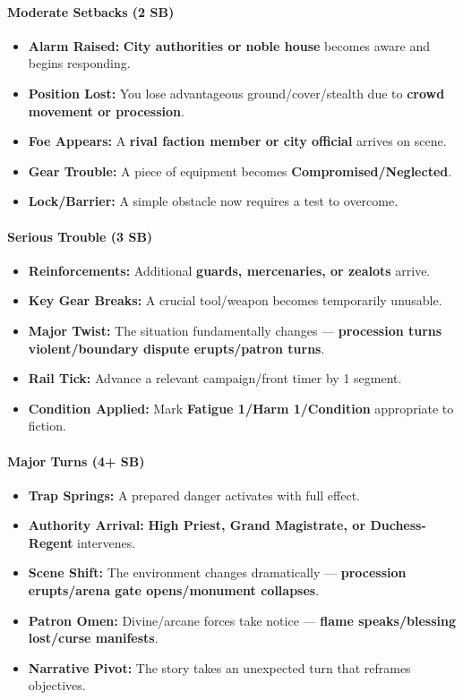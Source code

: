 \paragraph{Moderate Setbacks (2 SB)}
\begin{itemize}
\item \textbf{Alarm Raised:} \textbf{City authorities or noble house} becomes aware and begins responding.
\item \textbf{Position Lost:} You lose advantageous ground/cover/stealth due to \textbf{crowd movement or procession}.
\item \textbf{Foe Appears:} A \textbf{rival faction member or city official} arrives on scene.
\item \textbf{Gear Trouble:} A piece of equipment becomes \textbf{Compromised/Neglected}.
\item \textbf{Lock/Barrier:} A simple obstacle now requires a test to overcome.
\end{itemize}

\paragraph{Serious Trouble (3 SB)}
\begin{itemize}
\item \textbf{Reinforcements:} Additional \textbf{guards, mercenaries, or zealots} arrive.
\item \textbf{Key Gear Breaks:} A crucial tool/weapon becomes temporarily unusable.
\item \textbf{Major Twist:} The situation fundamentally changes --- \textbf{procession turns violent/boundary dispute erupts/patron turns}.
\item \textbf{Rail Tick:} Advance a relevant campaign/front timer by 1 segment.
\item \textbf{Condition Applied:} Mark \textbf{Fatigue 1/Harm 1/Condition} appropriate to fiction.
\end{itemize}

\paragraph{Major Turns (4+ SB)}
\begin{itemize}
\item \textbf{Trap Springs:} A prepared danger activates with full effect.
\item \textbf{Authority Arrival:} \textbf{High Priest, Grand Magistrate, or Duchess-Regent} intervenes.
\item \textbf{Scene Shift:} The environment changes dramatically --- \textbf{procession erupts/arena gate opens/monument collapses}.
\item \textbf{Patron Omen:} Divine/arcane forces take notice --- \textbf{flame speaks/blessing lost/curse manifests}.
\item \textbf{Narrative Pivot:} The story takes an unexpected turn that reframes objectives.
\end{itemize}

